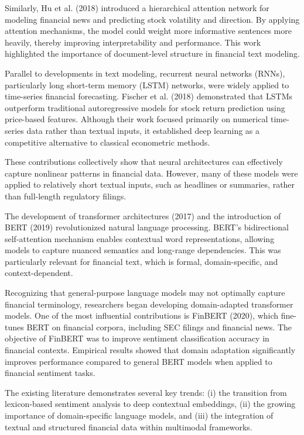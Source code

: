 Similarly, Hu et al. (2018)\cite{hu2018listening} introduced a hierarchical attention network for modeling financial news and predicting stock volatility and direction. By applying attention mechanisms, the model could weight more informative sentences more heavily, thereby improving interpretability and performance. This work highlighted the importance of document-level structure in financial text modeling.

Parallel to developments in text modeling, recurrent neural networks (RNNs), particularly long short-term memory (LSTM) networks, were widely applied to time-series financial forecasting. Fischer et al. (2018)\cite{fischer2018deep} demonstrated that LSTMs outperform traditional autoregressive models for stock return prediction using price-based features. Although their work focused primarily on numerical time-series data rather than textual inputs, it established deep learning as a competitive alternative to classical econometric methods.

These contributions collectively show that neural architectures can effectively capture nonlinear patterns in financial data. However, many of these models were applied to relatively short textual inputs, such as headlines or summaries, rather than full-length regulatory filings.

The development of transformer architectures (2017)\cite{vaswani2017attention} and the introduction of BERT (2019)\cite{devlin2019bertpretrainingdeepbidirectional} revolutionized natural language processing. BERT's bidirectional self-attention mechanism enables contextual word representations, allowing models to capture nuanced semantics and long-range dependencies. This was particularly relevant for financial text, which is formal, domain-specific, and context-dependent.

Recognizing that general-purpose language models may not optimally capture financial terminology, researchers began developing domain-adapted transformer models. One of the most influential contributions is FinBERT (2020)\cite{yang2020finbert}, which fine-tunes BERT on financial corpora, including SEC filings and financial news. The objective of FinBERT was to improve sentiment classification accuracy in financial contexts. Empirical results showed that domain adaptation significantly improves performance compared to general BERT models when applied to financial sentiment tasks.

The existing literature demonstrates several key trends: (i) the transition from lexicon-based sentiment analysis to deep contextual embeddings, (ii) the growing importance of domain-specific language models, and (iii) the integration of textual and structured financial data within multimodal frameworks.

